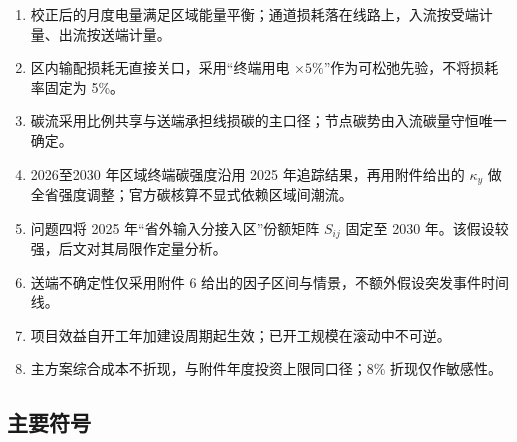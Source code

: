 \documentclass[UTF8,a4paper,zihao=-4,fontset=fandol]{ctexart}
\begin{document}
\begin{enumerate}[label=\textbf{H\arabic*.}]
\item 校正后的月度电量满足区域能量平衡；通道损耗落在线路上，入流按受端计量、出流按送端计量。
\item 区内输配损耗无直接关口，采用“终端用电 $\times 5\%$”作为可松弛先验，不将损耗率固定为 5\%。
\item 碳流采用比例共享与送端承担线损碳的主口径；节点碳势由入流碳量守恒唯一确定。
\item 2026至2030 年区域终端碳强度沿用 2025 年追踪结果，再用附件给出的 $\kappa_y$ 做全省强度调整；官方碳核算不显式依赖区域间潮流。
\item 问题四将 2025 年“省外输入分接入区”份额矩阵 $S_{ij}$ 固定至 2030 年。该假设较强，后文对其局限作定量分析。
\item 送端不确定性仅采用附件 6 给出的因子区间与情景，不额外假设突发事件时间线。
\item 项目效益自开工年加建设周期起生效；已开工规模在滚动中不可逆。
\item 主方案综合成本不折现，与附件年度投资上限同口径；8\% 折现仅作敏感性。
\end{enumerate}

\subsection{主要符号}
\end{document}
